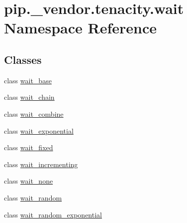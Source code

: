\hypertarget{namespacepip_1_1__vendor_1_1tenacity_1_1wait}{}\section{pip.\+\_\+vendor.\+tenacity.\+wait Namespace Reference}
\label{namespacepip_1_1__vendor_1_1tenacity_1_1wait}
\subsection*{Classes}
\begin{DoxyCompactItemize}
\item 
class \hyperlink{classpip_1_1__vendor_1_1tenacity_1_1wait_1_1wait__base}{wait\+\_\+base}
\item 
class \hyperlink{classpip_1_1__vendor_1_1tenacity_1_1wait_1_1wait__chain}{wait\+\_\+chain}
\item 
class \hyperlink{classpip_1_1__vendor_1_1tenacity_1_1wait_1_1wait__combine}{wait\+\_\+combine}
\item 
class \hyperlink{classpip_1_1__vendor_1_1tenacity_1_1wait_1_1wait__exponential}{wait\+\_\+exponential}
\item 
class \hyperlink{classpip_1_1__vendor_1_1tenacity_1_1wait_1_1wait__fixed}{wait\+\_\+fixed}
\item 
class \hyperlink{classpip_1_1__vendor_1_1tenacity_1_1wait_1_1wait__incrementing}{wait\+\_\+incrementing}
\item 
class \hyperlink{classpip_1_1__vendor_1_1tenacity_1_1wait_1_1wait__none}{wait\+\_\+none}
\item 
class \hyperlink{classpip_1_1__vendor_1_1tenacity_1_1wait_1_1wait__random}{wait\+\_\+random}
\item 
class \hyperlink{classpip_1_1__vendor_1_1tenacity_1_1wait_1_1wait__random__exponential}{wait\+\_\+random\+\_\+exponential}
\end{DoxyCompactItemize}
